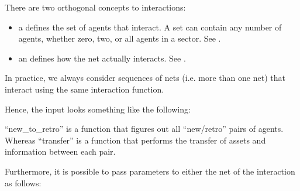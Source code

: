 \documentclass[letterpaper,10pt,english]{sphinxmanual}
\begin{document}
\begin{description}
There are two orthogonal concepts to interactions:
\begin{itemize}
\item {} 
a  defines the set of agents that interact. A set can contain any
number of agents, whether zero, two, or all agents in a sector. See
.

\item {} 
an  defines how the net actually interacts.  See
.

\end{itemize}

In practice, we always consider sequences of nets (i.e. more than one net) that
interact using the same interaction function.

Hence, the input looks something like the following:

\begin{sphinxVerbatim}[commandchars=\\\{\}]
  
  
\end{sphinxVerbatim}

“new\_to\_retro” is a function that figures out all “new/retro” pairs of agents.
Whereas “transfer” is a function that performs the transfer of assets and
information between each pair.

Furthermore, it is possible to pass parameters to either the net of the interaction
as follows:

\begin{sphinxVerbatim}[commandchars=\\\{\}]
     
     
\end{sphinxVerbatim}


\end{description}
\end{document}
